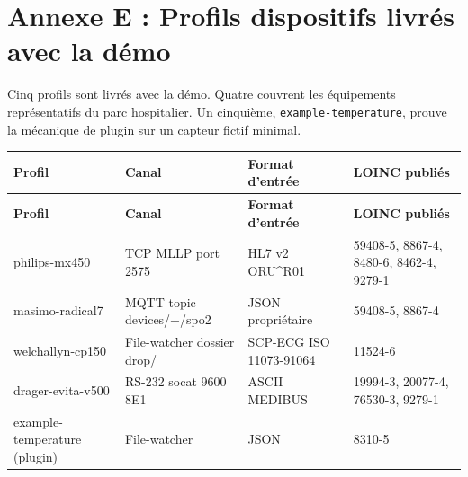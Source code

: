 \section*{Annexe E : Profils dispositifs livrés avec la démo}
\label{sec:annexe-profils}

Cinq profils sont livrés avec la démo. Quatre couvrent les équipements représentatifs du parc hospitalier. Un cinquième, \texttt{example-temperature}, prouve la mécanique de plugin sur un capteur fictif minimal.

\bridgezebra
\begin{longtable}{p{3.5cm}p{3.5cm}p{3.5cm}p{4cm}}
  \toprule
  \rowcolor{bridgeblue!90}
  {\color{white}\bfseries Profil} & {\color{white}\bfseries Canal} & {\color{white}\bfseries Format d'entrée} & {\color{white}\bfseries LOINC publiés} \\
  \midrule
  \endfirsthead
  \toprule
  \rowcolor{bridgeblue!90}
  {\color{white}\bfseries Profil} & {\color{white}\bfseries Canal} & {\color{white}\bfseries Format d'entrée} & {\color{white}\bfseries LOINC publiés} \\
  \midrule
  \endhead
  \bottomrule
  \endfoot
  philips-mx450 & TCP MLLP port 2575 & HL7 v2 ORU\textasciicircum{}R01 & 59408-5, 8867-4, 8480-6, 8462-4, 9279-1 \\
  masimo-radical7 & MQTT topic devices/+/spo2 & JSON propriétaire & 59408-5, 8867-4 \\
  welchallyn-cp150 & File-watcher dossier drop/ & SCP-ECG ISO 11073-91064 & 11524-6 \\
  drager-evita-v500 & RS-232 socat 9600 8E1 & ASCII MEDIBUS & 19994-3, 20077-4, 76530-3, 9279-1 \\
  example-temperature (plugin) & File-watcher & JSON & 8310-5 \\
\end{longtable}
